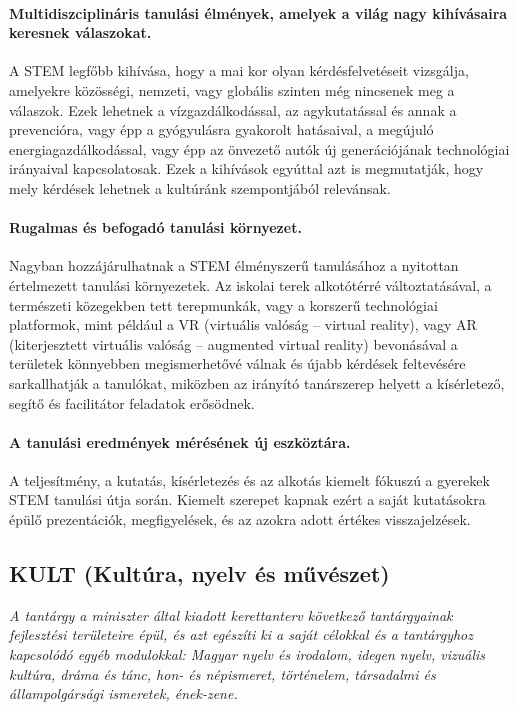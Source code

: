 \paragraph{Multidiszciplináris tanulási élmények, amelyek a világ nagy kihívásaira keresnek válaszokat.} A STEM legfőbb kihívása, hogy a mai kor olyan kérdésfelvetéseit vizsgálja, amelyekre közösségi, nemzeti, vagy globális szinten még nincsenek meg a válaszok. Ezek lehetnek a vízgazdálkodással, az agykutatással és annak a prevencióra, vagy épp a gyógyulásra gyakorolt hatásaival, a megújuló energiagazdálkodással, vagy épp az önvezető autók új generációjának technológiai irányaival kapcsolatosak. Ezek a kihívások egyúttal azt is megmutatják, hogy mely kérdések lehetnek a kultúránk szempontjából relevánsak.

\paragraph{Rugalmas és befogadó tanulási környezet.} Nagyban hozzájárulhatnak a STEM élményszerű tanulásához a nyitottan értelmezett tanulási környezetek. Az iskolai terek alkotótérré változtatásával, a természeti közegekben tett terepmunkák, vagy a korszerű technológiai platformok, mint például a VR (virtuális valóság – virtual reality), vagy AR (kiterjesztett virtuális valóság – augmented virtual reality) bevonásával a területek könnyebben megismerhetővé válnak és újabb kérdések feltevésére sarkallhatják a tanulókat, miközben az irányító tanárszerep helyett a kísérletező, segítő és facilitátor feladatok erősödnek.


\paragraph{A tanulási eredmények mérésének új eszköztára.} A teljesítmény, a kutatás, kísérletezés és az alkotás kiemelt fókuszú a gyerekek STEM tanulási útja során. Kiemelt szerepet kapnak ezért a saját kutatásokra épülő prezentációk, megfigyelések, és az azokra adott értékes visszajelzések.

\subsection[KULT]{KULT (Kultúra, nyelv és művészet)}
\emph{A tantárgy a miniszter által kiadott kerettanterv következő tantárgyainak fejlesztési területeire épül, és azt egészíti ki a saját célokkal és a tantárgyhoz kapcsolódó egyéb modulokkal: Magyar nyelv és irodalom, idegen nyelv, vizuális kultúra, dráma és tánc, hon- és népismeret, történelem, társadalmi és állampolgársági ismeretek, ének-zene.}

